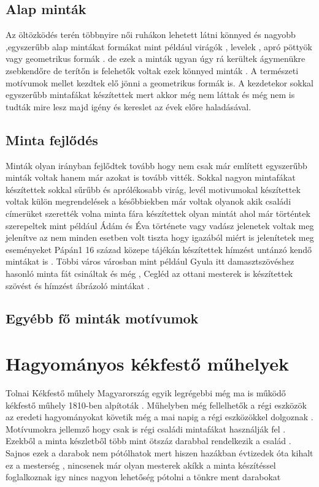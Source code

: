 \documentclass[fontsize=12pt, appendixprefix=true]{scrreprt}
\begin{document}
\subsection{Alap minták}
Az öltözködés terén többnyire női ruhákon lehetett látni könnyed és nagyobb ,egyszerűbb  alap mintákat formákat mint például virágók , levelek , apró pöttyök vagy geometrikus formák .
de ezek a minták ugyan úgy rá kerültek ágymenükre zsebkendőre de terítőn is felehetők voltak ezek könnyed minták .
A természeti motívumok mellet kezdtek elő jönni a geometrikus formák is.
A kezdetekor sokkal egyszerűbb mintafákat készítettek mert akkor még nem láttak és még nem is tudták mire lesz majd igény és kereslet az évek előre haladásával.

\subsection{Minta fejlődés}
Minták olyan irányban fejlődtek tovább hogy nem csak már említett egyszerűbb minták voltak hanem már azokat is tovább vitték.
 Sokkal nagyon mintafákat készítettek sokkal sűrűbb és aprólékosabb virág, levél  motivumokal készítettek voltak külön megrendelések a későbbiekben már voltak olyanok akik családi címerüket szerették  volna minta fára
 készítettek olyan mintát ahol már történtek szerepeltek mint például Ádám és Éva története vagy vadász jelenetek voltak meg jelenítve az nem minden esetben volt tiszta hogy igazából miért is jelenítetek meg eseményeket
 Pápán1 16 század közepe tájékán  készítettek hímzést untánzó kendő mintákat is .
  Többi város városban  mint például Gyula itt damasztszövéshez hasonló minta fát csináltak és még  , Cegléd  az ottani mesterek is  készítettek szövést és hímzést ábrázoló mintákat .


 


\subsection{Egyébb fő minták motívumok}
\section{Hagyományos kékfestő műhelyek}
Tolnai Kékfestő műhely Magyarország  egyik  legrégebbi még ma is működő kékfestő műhely 1810-ben alpítoták  .
Műhelyben még fellelhetők a régi eszközök  az eredeti hagyományokat követik még a mai napig a régi eszközökkel  dolgoznak .
Motívumokra jellemző hogy csak is régi családi mintafákat használják fel .
Ezekből a minta készletből több mint ötszáz darabbal rendelkezik a család .
Sajnos ezek a darabok nem pótólhatok mert hiszen hazákban évtizedek óta kihalt ez a mesterség , nincsenek már olyan mesterek akíkk  a minta készítéssel foglalkoznak 
igy nincs nagyon lehetőség pótolni a tönkre ment darabokat  
\end{document}
